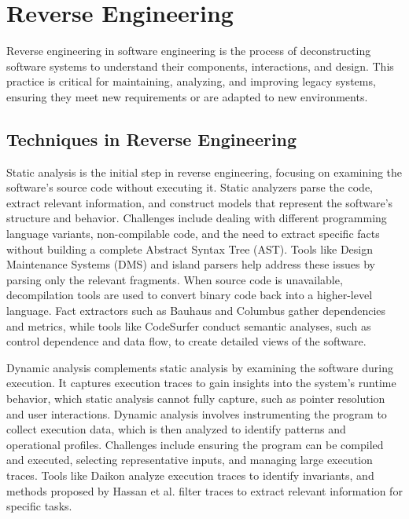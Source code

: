 \section{Reverse Engineering}
\cite{ReverseEngineering2011} \cite{ReverseEngineering2005} \cite{ReverseEngineering1990}

Reverse engineering in software engineering is the process of deconstructing software systems to understand their components, interactions, and design. This practice is critical for maintaining, analyzing, and improving legacy systems, ensuring they meet new requirements or are adapted to new environments.

\subsection{Techniques in Reverse Engineering}

Static analysis is the initial step in reverse engineering, focusing on examining the software's source code without executing it. Static analyzers parse the code, extract relevant information, and construct models that represent the software’s structure and behavior. Challenges include dealing with different programming language variants, non-compilable code, and the need to extract specific facts without building a complete Abstract Syntax Tree (AST). Tools like Design Maintenance Systems (DMS) and island parsers help address these issues by parsing only the relevant fragments. When source code is unavailable, decompilation tools are used to convert binary code back into a higher-level language. Fact extractors such as Bauhaus and Columbus gather dependencies and metrics, while tools like CodeSurfer conduct semantic analyses, such as control dependence and data flow, to create detailed views of the software.

Dynamic analysis complements static analysis by examining the software during execution. It captures execution traces to gain insights into the system's runtime behavior, which static analysis cannot fully capture, such as pointer resolution and user interactions. Dynamic analysis involves instrumenting the program to collect execution data, which is then analyzed to identify patterns and operational profiles. Challenges include ensuring the program can be compiled and executed, selecting representative inputs, and managing large execution traces. Tools like Daikon analyze execution traces to identify invariants, and methods proposed by Hassan et al. filter traces to extract relevant information for specific tasks.

